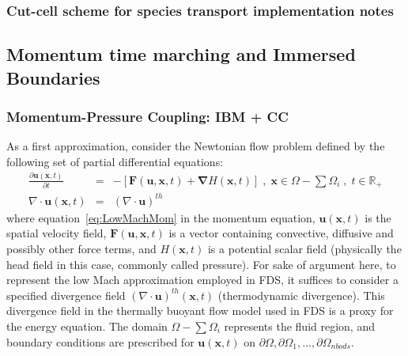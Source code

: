 \documentclass[12pt]{article}
\begin{document}
\subsubsection{Cut-cell scheme for species transport implementation notes}


\subsection{Momentum time marching and Immersed Boundaries}

\subsubsection{Momentum-Pressure Coupling: IBM + CC}

As a first approximation, consider the Newtonian flow problem defined by the following set of partial differential equations:
%
\begin{eqnarray}
  \frac{\partial \mathbf{u}(\mathbf{x},t)}{\partial t} &=& - \left[ \mathbf{F}(\mathbf{u},\mathbf{x},t) + \boldsymbol{\nabla} H(\mathbf{x},t) \right] \; , \; \mathbf{x} \in \Omega - \sum{\Omega_i} \; , \; t \in \mathbb{R}_+ \label{eq:LowMachMom} \\
         \nabla \cdot \mathbf{u} (\mathbf{x},t) & = & \left(\nabla \cdot \mathbf{u} \right)^{th} \label{eq:LowMachDiv}
\end{eqnarray}
%
where equation~\eqref{eq:LowMachMom} in the momentum equation, $\mathbf{u}(\mathbf{x},t)$ is the spatial velocity field, $\mathbf{F}(\mathbf{u},\mathbf{x},t)$ is a vector containing convective, diffusive and possibly other force terms, and $H(\mathbf{x},t)$ is a potential scalar field (physically the head field in this case, commonly called pressure). For sake of argument here, to represent the low Mach approximation employed in FDS, it suffices to consider a specified divergence field $\left(\nabla \cdot \mathbf{u} \right)^{th} (\mathbf{x},t)$ (thermodynamic divergence). This divergence field in the thermally buoyant flow model used in FDS is a proxy for the energy equation.
The domain $\Omega - \sum{\Omega_i}$ represents the fluid region, and boundary conditions are prescribed for $\mathbf{u}(\mathbf{x},t)$ on $\partial \Omega,\partial \Omega_1,...,\partial \Omega_{nbods}$.
\end{document}
